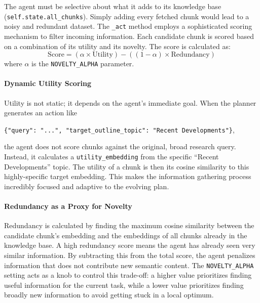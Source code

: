 \documentclass[12pt, a4paper]{article}
\begin{document}
The agent must be selective about what it adds to its knowledge base (\verb|self.state.all_chunks|). Simply adding every fetched chunk would lead to a noisy and redundant dataset. The \verb|_act| method employs a sophisticated scoring mechanism to filter incoming information. Each candidate chunk is scored based on a combination of its utility and its novelty. The score is calculated as:
\begin{equation}
\mathrm{Score} = (\alpha \times \mathrm{Utility}) - ((1 - \alpha) \times \mathrm{Redundancy})
\end{equation}
where $\alpha$ is the \verb|NOVELTY_ALPHA| parameter.

\paragraph{Dynamic Utility Scoring}
Utility is not static; it depends on the agent's immediate goal. When the planner generates an action like 

\verb|{"query": "...", "target_outline_topic": "Recent Developments"}|, 

the agent does not score chunks against the original, broad research query. Instead, it calculates a \verb|utility_embedding| from the specific ``Recent Developments'' topic. The utility of a chunk is then its cosine similarity to this highly-specific target embedding. This makes the information gathering process incredibly focused and adaptive to the evolving plan.

\paragraph{Redundancy as a Proxy for Novelty}
Redundancy is calculated by finding the maximum cosine similarity between the candidate chunk's embedding and the embeddings of all chunks already in the knowledge base. A high redundancy score means the agent has already seen very similar information. By subtracting this from the total score, the agent penalizes information that does not contribute new semantic content. The \verb|NOVELTY_ALPHA| setting acts as a knob to control this trade-off: a higher value prioritizes finding useful information for the current task, while a lower value prioritizes finding broadly new information to avoid getting stuck in a local optimum.


\end{document}
